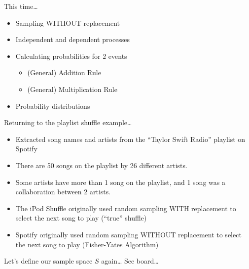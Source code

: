 \documentclass[
  ignorenonframetext,
]{beamer}
\begin{document}
\begin{frame}{This time\ldots{}}
\label{this-time}
\begin{itemize}
\item
  Sampling WITHOUT replacement
\item
  Independent and dependent processes
\item
  Calculating probabilities for 2 events

  \begin{itemize}
  \item
    (General) Addition Rule
  \item
    (General) Multiplication Rule
  \end{itemize}
\item
  Probability distributions
\end{itemize}
\end{frame}

\begin{frame}{Returning to the playlist shuffle example\ldots{}}
\label{returning-to-the-playlist-shuffle-example}
\begin{itemize}
\item
  Extracted song names and artists from the ``Taylor Swift Radio''
  playlist on Spotify
\item
  There are 50 songs on the playlist by 26 different artists.
\item
  Some artists have more than 1 song on the playlist, and 1 song was a
  collaboration between 2 artists.
\item
  The iPod Shuffle originally used random sampling WITH replacement to
  select the next song to play (``true'' shuffle)
\item
  Spotify originally used random sampling WITHOUT replacement to select
  the next song to play (Fisher-Yates Algorithm)
\end{itemize}
\end{frame}

\begin{frame}{Let's define our sample space \(S\) again\ldots{}}
\label{lets-define-our-sample-space-s-again}
See board\ldots{}
\end{frame}
\end{document}
